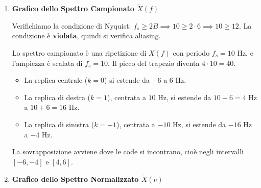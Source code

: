 \begin{soluzione}{23}
\begin{enumerate}
        \item \textbf{Grafico dello Spettro Campionato $\tilde{X}(f)$}
        
        Verifichiamo la condizione di Nyquist: $f_s \ge 2B \implies 10 \ge 2 \cdot 6 \implies 10 \ge 12$. La condizione è \textbf{violata}, quindi si verifica aliasing.
        
        Lo spettro campionato è una ripetizione di $X(f)$ con periodo $f_s = 10$ Hz, e l'ampiezza è scalata di $f_s=10$. Il picco del trapezio diventa $4 \cdot 10 = 40$.
        
        \begin{itemize}
            \item La replica centrale ($k=0$) si estende da $-6$ a $6$ Hz.
            \item La replica di destra ($k=1$), centrata a $10$ Hz, si estende da $10-6=4$ Hz a $10+6=16$ Hz.
            \item La replica di sinistra ($k=-1$), centrata a $-10$ Hz, si estende da $-16$ Hz a $-4$ Hz.
        \end{itemize}
        La sovrapposizione avviene dove le code si incontrano, cioè negli intervalli $[-6, -4]$ e $[4, 6]$.
        
        \begin{center}
        \end{center}
        
        \item \textbf{Grafico dello Spettro Normalizzato $\tilde{X}(\nu)$}
        

\end{enumerate}
\end{soluzione}
